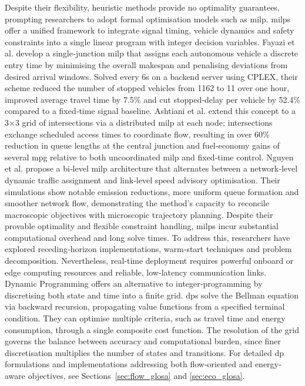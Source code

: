 Despite their flexibility, heuristic methods provide no optimality guarantees, prompting researchers to adopt formal optimisation models such as \ac{milp}. \acp{milp} offer a unified framework to integrate signal timing, vehicle dynamics and safety constraints into a single linear program with integer decision variables. Fayazi et al. \cite{Fayazi2017} develop a single‐junction \ac{milp} that assigns each autonomous vehicle a discrete entry time by minimising the overall makespan and penalising deviations from desired arrival windows. Solved every 6s on a backend server using CPLEX, their scheme reduced the number of stopped vehicles from 1162 to 11 over one hour, improved average travel time by 7.5\% and cut stopped‐delay per vehicle by 52.4\% compared to a fixed‐time signal baseline. Ashtiani et al. \cite{Ashtiani2018} extend this concept to a 3×3 grid of intersections via a distributed \ac{milp} at each node; intersections exchange scheduled access times to coordinate flow, resulting in over 60\% reduction in queue lengths at the central junction and fuel‐economy gains of several \ac{mpg} relative to both uncoordinated \ac{milp} and fixed‐time control. Nguyen et al. \cite{Nguyen2022} propose a bi‐level \ac{milp} architecture that alternates between a network‐level dynamic traffic assignment and link‐level speed advisory optimisation. Their simulations show notable emission reductions, more uniform queue formation and smoother network flow, demonstrating the method’s capacity to reconcile macroscopic objectives with microscopic trajectory planning. Despite their provable optimality and flexible constraint handling, \acp{milp} incur substantial computational overhead and long solve times. To address this, researchers have explored receding‐horizon implementations, warm‐start techniques and problem decomposition. Nevertheless, real‐time deployment requires powerful onboard or edge computing resources and reliable, low‐latency communication links.   
\mynewline
Dynamic Programming offers an alternative to integer‐programming by discretising both state and time into a finite grid. \acp{dp} solve the Bellman equation via backward recursion, propagating value functions from a specified terminal condition. They can optimise multiple criteria, such as travel time and energy consumption, through a single composite cost function. The resolution of the grid governs the balance between accuracy and computational burden, since finer discretisation multiplies the number of states and transitions. For detailed \ac{dp} formulations and implementations addressing both flow‐oriented and energy‐aware objectives, see Sections~\ref{sec:flow_glosa} and \ref{sec:eco_glosa}.

